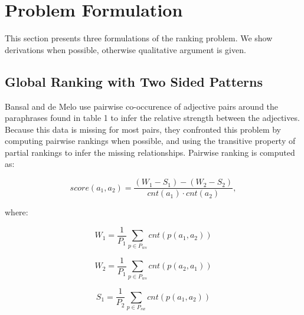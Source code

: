 


\section{Problem Formulation}

This section presents three formulations of the ranking problem. We show derivations when possible, otherwise qualitative argument is given.

\subsection{Global Ranking with Two Sided Patterns}

Bansal and de Melo  use pairwise co-occurence of adjective pairs around the paraphrases found in table 1 to infer the relative strength between the adjectives. Because this data is missing for most pairs, they confronted this problem by computing pairwise rankings when possible, and using the transitive property of partial rankings to infer the missing relationships. Pairwise ranking is computed as:

\[ score(a_1, a_2) = \frac{(W_1 - S_1) - (W_2 - S_2)}{cnt(a_1) \cdot cnt(a_2)}, \]

where:

\[ W_1 = \frac{1}{P_1} \sum_{p \in P_{ws}} cnt(p(a_1, a_2))\]

\[ W_2 = \frac{1}{P_1} \sum_{p \in P_{ws}} cnt(p(a_2, a_1))\]

\[ S_1 = \frac{1}{P_2} \sum_{p \in P_{sw}} cnt(p(a_1, a_2))\]

